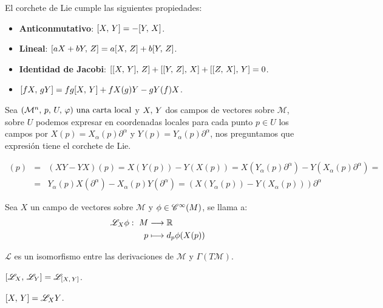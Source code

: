 El corchete de Lie cumple las siguientes propiedades:
\begin{itemize}
	\item \textbf{Anticonmutativo}: $[X,\thinspace Y]=-[Y,\thinspace X]$.
	\item \textbf{Lineal}: $[aX+bY,\thinspace Z]=a[X,\thinspace Z]+b[Y,\thinspace Z]$.
	\item \textbf{Identidad de Jacobi}: $[[X,\thinspace Y],\thinspace Z]+[[Y,\thinspace Z],\thinspace X]+[[Z,\thinspace X],\thinspace Y]=0$.
	\item $[fX,\thinspace gY]=fg[X,\thinspace Y]+fX(g)Y-gY(f)X$.
\end{itemize}

Sea $(\mathcal{M}^n,\thinspace p,\thinspace U,\thinspace \varphi)\textmd{ una carta local}$ y $X,\thinspace Y$ dos campos de vectores sobre $\mathcal{M}$, sobre $U$ podemos expresar en coordenadas
locales para cada punto $p\in U$ los campos por $X(p)=X_\alpha(p)\partial^\alpha$ y $Y(p)=Y_\alpha(p)\partial^\alpha$,
nos preguntamos que expresión tiene el corchete de Lie.

\begin{eqnarray*}
[X\coma Y]
	(p) & = & (XY-YX)(p) = X(Y(p))-Y(X(p))=X(Y_\alpha(p)\partial^\alpha)-Y(X_\alpha(p)
	\partial^\alpha) = \\
	& = & Y_\alpha(p)X(\partial^\alpha)-X_\alpha(p)Y(\partial^\alpha) = (X(Y_\alpha(p))-Y(X_\alpha(p)))\partial^\alpha
\end{eqnarray*}

\begin{definition}
	Sea $X$ un campo de vectores sobre $\mathcal{M}$ y $\phi\in\mathscr{C}^\infty(M)$, se llama  a:
	\begin{equation}
		\label{eq:derivada-lie-funcion-campo}
		\begin{alignedat}{1}
			\mathscr{L}_X \phi:\ M & \longrightarrow \mathbb{R} \\ p & \longmapsto d_p \phi(X(p))
		\end{alignedat}
	\end{equation}
\end{definition}

\begin{proposition}
	$\mathscr{L}$ es un isomorfismo entre las derivaciones de $\mathcal{M}$ y $\Gamma(T\mathcal{M})$.
\end{proposition}

\begin{proposition}
	$[\mathscr{L}_X,\thinspace \mathscr{L}_Y]=\mathscr{L}_{[X,\thinspace Y]}$.
\end{proposition}

\begin{proposition}
	$[X,\thinspace Y]=\mathscr{L}_X Y$.
\end{proposition}


